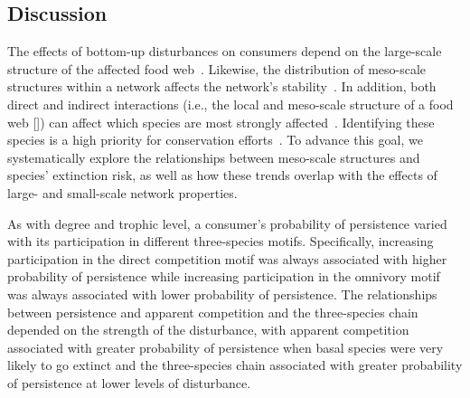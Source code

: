 \documentclass[12pt]{article}
\begin{document}
\begin{spacing}{2.0}


        




\section*{Discussion}

    The effects of bottom-up disturbances on consumers depend on the large-scale structure of the affected food web~\citep{Dunne2002, Eklof2006, PascualDunne2006}.
    Likewise, the distribution of meso-scale structures within a network affects the network's stability~\citep{prill2005dynamic, bascompte2005simple}.
    In addition, both direct and indirect interactions (i.e., the local and meso-scale structure of a food web  [\citealp[]{Cirtwill2018FoodWebs}]) can affect which species are most strongly affected~\citep{curtsdotter2011robustness, dunne2009cascading, Eklof2006}. 
    Identifying these species is a high priority for conservation efforts~\citep{Bottrilletal2008}.
    To advance this goal, we systematically explore the relationships between meso-scale structures and species' extinction risk, as well as how these trends overlap with the effects of large- and small-scale network properties.

    
    As with degree and trophic level, a consumer's probability of persistence varied with its participation in different three-species motifs.
    Specifically, increasing participation in the direct competition motif was always associated with higher probability of persistence while increasing participation in the omnivory motif was always associated with lower probability of persistence.
    The relationships between persistence and apparent competition and the three-species chain depended on the strength of the disturbance, with apparent competition associated with greater probability of persistence when basal species were very likely to go extinct and the three-species chain associated with greater probability of persistence at lower levels of disturbance. 
    


\end{spacing}
\end{document}
